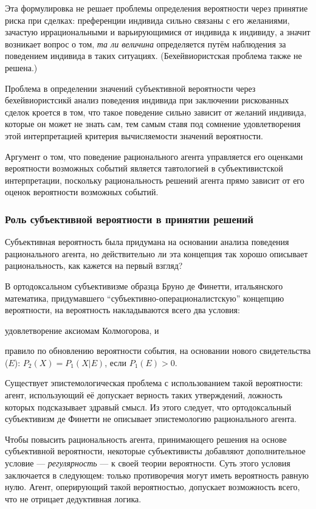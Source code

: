 \documentclass[14pt, a4paper, pdftex]{extarticle}
\begin{document}
Эта формулировка не решает проблемы определения вероятности через принятие риска при сделках: преференции индивида сильно связаны с его желаниями, зачастую иррациональными и варьирующимися от индивида к индивиду, а значит возникает вопрос о том, \emph{та ли величина} определяется путём наблюдения за поведением индивида в таких ситуациях. (Бехейвиористская проблема также не решена.)

Проблема в определении значений субъективной вероятности через бехейвиористсикй анализ поведения индивида при заключении рискованных сделок кроется в том, что такое поведение сильно зависит от желаний индивида, которые он может не знать сам, тем самым ставя под сомнение удовлетворения этой интерпретацией критерия вычисляемости значений вероятности.

Аргумент о том, что поведение рационального агента управляется его оценками вероятности возможных событий является тавтологией в субъективистской интерпретации, поскольку рациональность решений агента прямо зависит от его оценок вероятности возможных событий. 

\subsubsection{Роль субъективной вероятности в принятии решений}

Субъективная вероятность была придумана на основании анализа поведения рационального агента, но действительно ли эта концепция так хорошо описывает рациональность, как кажется на первый взгляд?

В ортодоксальном субъективизме образца Бруно де Финетти, итальянского математика, придумавшего ``субъективно-операционалистскую'' концепцию вероятности, на вероятность накладываются всего два условия:
\begin{inparaenum}[a)]
\item удовлетворение аксиомам Колмогорова, и
\item правило по обновлению вероятности события, на основании нового свидетельства ($E$): $P_2(X) = P_1(X|E)$, если $P_1(E) > 0$.
\end{inparaenum}

Существует эпистемологическая проблема с использованием такой вероятности: агент, использующий её допускает верность таких утверждений, ложность которых подсказывает здравый смысл. Из этого следует, что ортодоксальный субъективизм де Финетти не описывает эпистемологию рационального агента.

Чтобы повысить рациональность агента, принимающего решения на основе субъективной вероятности, некоторые субъективисты добавляют дополнительное условие --- \emph{регулярность} --- к своей теории вероятности. Суть этого условия заключается в следующем: только противоречия могут иметь вероятность равную нулю. Агент, оперирующий такой вероятностью, допускает возможность всего, что не отрицает дедуктивная логика. 
\end{document}
